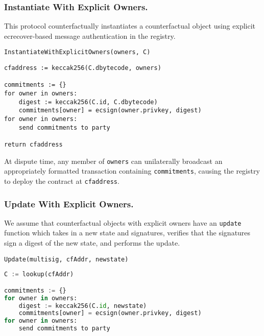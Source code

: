 \documentclass[prb,floatfix,reprint,nofootinbib,amsmath,amssymb,epsfig,pre,floats,letterpaper,groupedaffiliation,tightenlines,allcolors=blue,11pt]{revtex4}
\theoremstyle{definition}
\theoremstyle{definition}
\theoremstyle{definition}
\begin{document}
\subsubsection{Instantiate With Explicit Owners.} \label{sec:instantiate_eo} This protocol counterfactually instantiates a counterfactual object using explicit ecrecover-based message authentication in the registry.

\vspace{1.5em}
\begin{protocol}{\texttt{InstantiateWithExplicitOwners(owners, C)}}
\begin{lstlisting}
cfaddress := keccak256(C.dbytecode, owners)

commitments := {}
for owner in owners:
    digest := keccak256(C.id, C.dbytecode)
    commitments[owner] = ecsign(owner.privkey, digest)
for owner in owners:
    send commitments to party

return cfaddress
\end{lstlisting}
\end{protocol}
\vspace{1.5em}

At dispute time, any member of \texttt{owners} can unilaterally broadcast an appropriately formatted transaction containing \texttt{commitments}, causing the registry to deploy the contract at \texttt{cfaddress}.

\subsubsection{Update With Explicit Owners.}

We assume that counterfactual objects with explicit owners have an \texttt{update} function which takes in a new state and signatures, verifies that the signatures sign a digest of the new state, and performs the update.

\vspace{1.5em}
\begin{protocol}{\texttt{Update(multisig, cfAddr, newstate)}}
\begin{lstlisting}[language=Python]
C := lookup(cfAddr)

commitments := {}
for owner in owners:
    digest := keccak256(C.id, newstate)
    commitments[owner] = ecsign(owner.privkey, digest)
for owner in owners:
    send commitments to party
\end{lstlisting}
\end{protocol}
\vspace{1.5em}
\end{document}
